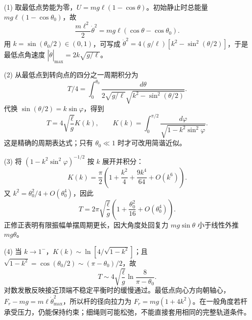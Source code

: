 (1) 取最低点势能为零，\(U=mg\ell(1-\cos\theta)\)。初始静止时总能量 \(mg\ell(1-\cos\theta_0)\)，故
\[
\frac{m\ell^2}2\dot\theta^2=mg\ell(\cos\theta-\cos\theta_0).
\]
用 \(k=\sin(\theta_0/2)\in(0,1)\)，可写成 \(\dot\theta^2=4(g/\ell)[k^2-\sin^2(\theta/2)]\)，于是最低点角速度 \(|\dot\theta|_{\max}=2k\sqrt{g/\ell}\)。

(2) 从最低点到转向点的四分之一周期积分为
\[
T/4=\int_0^{\theta_0}\frac{d\theta}{2\sqrt{g/\ell}\sqrt{k^2-\sin^2(\theta/2)}}.
\]
代换 \(\sin(\theta/2)=k\sin\varphi\)，得到
\[
T=4\sqrt{\frac{\ell}{g}}K(k),\qquad
K(k)=\int_0^{\pi/2}\frac{d\varphi}{\sqrt{1-k^2\sin^2\varphi}}.
\]
这是精确的周期表达式；只有 \(\theta_0\ll1\) 时才可改用简谐近似。

(3) 将 \((1-k^2\sin^2\varphi)^{-1/2}\) 按 \(k\) 展开并积分：
\[
K(k)=\frac{\pi}{2}\left(1+\frac{k^2}{4}+\frac{9k^4}{64}+O(k^6)\right).
\]
又 \(k^2=\theta_0^2/4+O(\theta_0^4)\)，因此
\[
T=2\pi\sqrt{\frac{\ell}{g}}\left(1+\frac{\theta_0^2}{16}+O(\theta_0^4)\right).
\]
正修正表明有限振幅单摆周期更长，因大角度处回复力 \(mg\sin\theta\) 小于线性外推 \(mg\theta\)。

(4) 当 \(k\to1^-\)，\(K(k)\sim\ln[4/\sqrt{1-k^2}]\)；且 \(\sqrt{1-k^2}=\cos(\theta_0/2)\sim(\pi-\theta_0)/2\)，故
\[
T\sim4\sqrt{\frac{\ell}{g}}\ln\frac{8}{\pi-\theta_0}.
\]
对数发散反映接近顶端不稳定平衡时的缓慢通过。最低点向心方向朝轴心，\(F_r-mg=m\ell\dot\theta_{\max}^2\)，所以杆的径向拉力为 \(F_r=mg(1+4k^2)\)。在一般角度若杆承受压力，仍能保持约束；细绳则可能松弛，不能直接套用相同的完整轨道条件。
